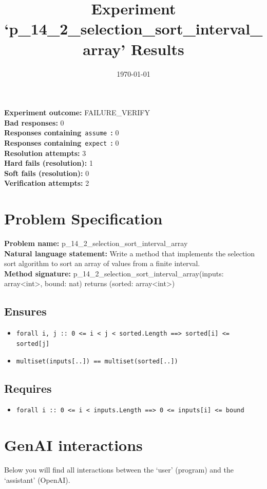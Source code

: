 \documentclass{article}
\begin{document}
\title{Experiment `p\_14\_2\_selection\_sort\_interval\_array' Results}
\author{\today}
\date{}
\maketitle
\textbf{Experiment outcome: }FAILURE\_VERIFY
\\\textbf{Bad responses: }0
\\\textbf{Responses containing}~\texttt{assume}~\textbf{: }0
\\\textbf{Responses containing}~\texttt{expect}~\textbf{: }0
\\\textbf{Resolution attempts: }3
\\\textbf{Hard fails (resolution): }1
\\\textbf{Soft fails (resolution): }0
\\\textbf{Verification attempts: }2
\section*{Problem Specification}
\textbf{Problem name: }p\_14\_2\_selection\_sort\_interval\_array
\\\textbf{Natural language statement: }Write a method that implements the selection sort algorithm to sort an array of values from a finite interval.
\\\textbf{Method signature: }p\_14\_2\_selection\_sort\_interval\_array(inputs: array<int>, bound: nat) returns (sorted: array<int>)
\subsection*{Ensures}
\begin{itemize}
\item \texttt{forall i, j :: 0 <= i < j < sorted.Length ==> sorted[i] <= sorted[j]}
\item \texttt{multiset(inputs[..]) == multiset(sorted[..])}
\end{itemize}
\subsection*{Requires}
\begin{itemize}
\item \texttt{forall i :: 0 <= i < inputs.Length ==> 0 <= inputs[i] <= bound}
\end{itemize}
\clearpage
\section*{GenAI interactions}
Below you will find all interactions between the `user' (program) and the `assistant' (OpenAI).
\end{document}
